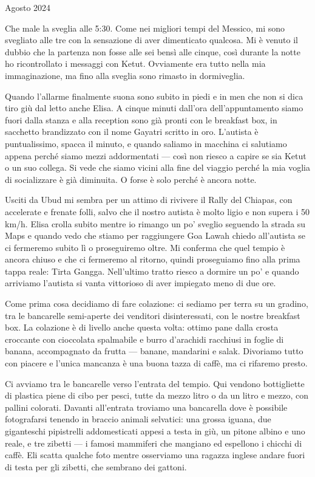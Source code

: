 
 Agosto 2024 \newline

Che male la sveglia alle 5:30. Come nei migliori tempi del Messico, mi sono svegliato alle tre con la sensazione di aver dimenticato qualcosa. Mi è venuto il dubbio che la partenza non fosse alle sei bensì alle cinque, così durante la notte ho ricontrollato i messaggi con Ketut. Ovviamente era tutto nella mia immaginazione, ma fino alla sveglia sono rimasto in dormiveglia.

Quando l'allarme finalmente suona sono subito in piedi e in men che non si dica tiro giù dal letto anche Elisa. A cinque minuti dall'ora dell'appuntamento siamo fuori dalla stanza e alla reception sono già pronti con le breakfast box, in sacchetto brandizzato con il nome Gayatri scritto in oro. L'autista è puntualissimo, spacca il minuto, e quando saliamo in macchina ci salutiamo appena perché siamo mezzi addormentati — così non riesco a capire se sia Ketut o un suo collega. Si vede che siamo vicini alla fine del viaggio perché la mia voglia di socializzare è già diminuita. O forse è solo perché è ancora notte.

Usciti da Ubud mi sembra per un attimo di rivivere il Rally del Chiapas, con accelerate e frenate folli, salvo che il nostro autista è molto ligio e non supera i 50 km/h. Elisa crolla subito mentre io rimango un po' sveglio seguendo la strada su Maps e quando vedo che stiamo per raggiungere Goa Lawah chiedo all'autista se ci fermeremo subito lì o proseguiremo oltre. Mi conferma che quel tempio è ancora chiuso e che ci fermeremo al ritorno, quindi proseguiamo fino alla prima tappa reale: Tirta Gangga. Nell'ultimo tratto riesco a dormire un po' e quando arriviamo l'autista si vanta vittorioso di aver impiegato meno di due ore.

Come prima cosa decidiamo di fare colazione: ci sediamo per terra su un gradino, tra le bancarelle semi-aperte dei venditori disinteressati, con le nostre breakfast box. La colazione è di livello anche questa volta: ottimo pane dalla crosta croccante con cioccolata spalmabile e burro d'arachidi racchiusi in foglie di banana, accompagnato da frutta — banane, mandarini e salak. Divoriamo tutto con piacere e l'unica mancanza è una buona tazza di caffè, ma ci rifaremo presto.

Ci avviamo tra le bancarelle verso l'entrata del tempio. Qui vendono bottigliette di plastica piene di cibo per pesci, tutte da mezzo litro o da un litro e mezzo, con pallini colorati. Davanti all'entrata troviamo una bancarella dove è possibile fotografarsi tenendo in braccio animali selvatici: una grossa iguana, due giganteschi pipistrelli addomesticati appesi a testa in giù, un pitone albino e uno reale, e tre zibetti — i famosi mammiferi che mangiano ed espellono i chicchi di caffè. Eli scatta qualche foto mentre osserviamo una ragazza inglese andare fuori di testa per gli zibetti, che sembrano dei gattoni.

